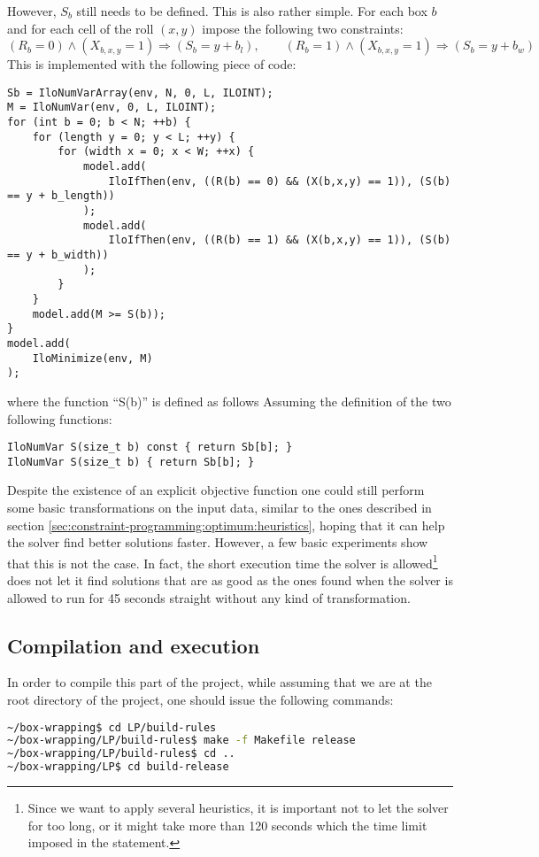 However, $S_b$ still needs to be defined. This is also rather simple. For each box $b$ and for
each cell of the roll $(x,y)$ impose the following two constraints:
\[
(R_b = 0) \wedge (X_{b,x,y} = 1) \Longrightarrow (S_b = y + b_l), \qquad
(R_b = 1) \wedge (X_{b,x,y} = 1) \Longrightarrow (S_b = y + b_w)
\]
This is implemented with the following piece of code:
{\NOINDENT \begin{lstlisting}
Sb = IloNumVarArray(env, N, 0, L, ILOINT);
M = IloNumVar(env, 0, L, ILOINT);
for (int b = 0; b < N; ++b) {
	for (length y = 0; y < L; ++y) {
		for (width x = 0; x < W; ++x) {
			model.add(
				IloIfThen(env, ((R(b) == 0) && (X(b,x,y) == 1)), (S(b) == y + b_length))
			);
			model.add(
				IloIfThen(env, ((R(b) == 1) && (X(b,x,y) == 1)), (S(b) == y + b_width))
			);
		}
	}
	model.add(M >= S(b));
}
model.add(
	IloMinimize(env, M)
);
\end{lstlisting}}
where the function ``S(b)'' is defined as follows
Assuming the definition of the two following functions:
{\NOINDENT \begin{lstlisting}
IloNumVar S(size_t b) const { return Sb[b]; }
IloNumVar S(size_t b) { return Sb[b]; }
\end{lstlisting}}

Despite the existence of an explicit objective function one could still perform
some basic transformations on the input data, similar to the ones described in
section \ref{sec:constraint-programming:optimum:heuristics}, hoping that it can
help the solver find better solutions faster. However, a few basic experiments
show that this is not the case. In fact, the short execution time the solver is
allowed\footnote{ Since we want to apply several heuristics, it is important not
to let the solver for too long, or it might take more than 120 seconds which the
time limit imposed in the statement.} does not let it find solutions that are
as good as the ones found when the solver is allowed to run for 45 seconds straight
without any kind of transformation.

\subsection{Compilation and execution}
\label{sec:linear-programming:compilation-execution}

In order to compile this part of the project, while assuming that we are at the
root directory of the project, one should issue the following commands:
\begin{lstlisting}[language=bash]
~/box-wrapping$ cd LP/build-rules
~/box-wrapping/LP/build-rules$ make -f Makefile release
~/box-wrapping/LP/build-rules$ cd ..
~/box-wrapping/LP$ cd build-release
\end{lstlisting}


